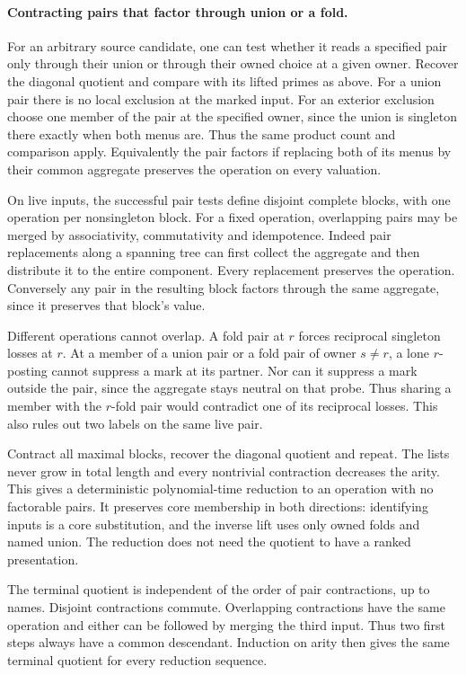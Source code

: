 \paragraph{Contracting pairs that factor through union or a fold.}
For an arbitrary source candidate, one can test whether
it reads a specified pair only through their union or
through their owned choice at a given owner. Recover the
diagonal quotient and compare with its lifted primes as
above. For a union pair there is no local exclusion at
the marked input. For an exterior exclusion choose one
member of the pair at the specified owner, since the
union is singleton there exactly when both menus are.
Thus the same product count and comparison apply.
Equivalently the pair factors if replacing both of its
menus by their common aggregate preserves the operation
on every valuation.

On live inputs, the successful pair tests define
disjoint complete blocks, with one operation per
nonsingleton block. For a fixed operation, overlapping
pairs may be merged by associativity, commutativity
and idempotence. Indeed pair replacements along a
spanning tree can first collect the aggregate and
then distribute it to the entire component. Every
replacement preserves the operation. Conversely any
pair in the resulting block factors through the same
aggregate, since it preserves that block's value.

Different operations cannot overlap. A fold pair at
$r$ forces reciprocal singleton losses at $r$. At a
member of a union pair or a fold pair of owner $s\ne r$,
a lone $r$-posting cannot suppress a mark at its partner.
Nor can it suppress a mark outside the pair, since the
aggregate stays neutral on that probe. Thus sharing a
member with the $r$-fold pair would contradict one of
its reciprocal losses. This also rules out two labels
on the same live pair.

Contract all maximal blocks, recover the diagonal
quotient and repeat. The lists never grow in total
length and every nontrivial contraction decreases the
arity. This gives a deterministic polynomial-time
reduction to an operation with no factorable pairs.
It preserves core membership in both directions:
identifying inputs is a core substitution, and the
inverse lift uses only owned folds and named union.
The reduction does not need the quotient to have a
ranked presentation.

The terminal quotient is independent of the order of
pair contractions, up to names. Disjoint contractions
commute. Overlapping contractions have the same
operation and either can be followed by merging the
third input. Thus two first steps always have a common
descendant. Induction on arity then gives the same
terminal quotient for every reduction sequence.


